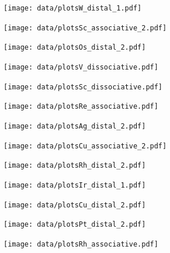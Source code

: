 \begin{figure}
\centering
\texttt{[image: data/plotsW\_distal\_1.pdf]}
\end{figure}

\begin{figure}
\centering
\texttt{[image: data/plotsSc\_associative\_2.pdf]}
\end{figure}

\begin{figure}
\centering
\texttt{[image: data/plotsOs\_distal\_2.pdf]}
\end{figure}

\begin{figure}
\centering
\texttt{[image: data/plotsV\_dissociative.pdf]}
\end{figure}

\begin{figure}
\centering
\texttt{[image: data/plotsSc\_dissociative.pdf]}
\end{figure}

\begin{figure}
\centering
\texttt{[image: data/plotsRe\_associative.pdf]}
\end{figure}

\begin{figure}
\centering
\texttt{[image: data/plotsAg\_distal\_2.pdf]}
\end{figure}

\begin{figure}
\centering
\texttt{[image: data/plotsCu\_associative\_2.pdf]}
\end{figure}

\begin{figure}
\centering
\texttt{[image: data/plotsRh\_distal\_2.pdf]}
\end{figure}

\begin{figure}
\centering
\texttt{[image: data/plotsIr\_distal\_1.pdf]}
\end{figure}

\begin{figure}
\centering
\texttt{[image: data/plotsCu\_distal\_2.pdf]}
\end{figure}

\begin{figure}
\centering
\texttt{[image: data/plotsPt\_distal\_2.pdf]}
\end{figure}

\begin{figure}
\centering
\texttt{[image: data/plotsRh\_associative.pdf]}
\end{figure}

